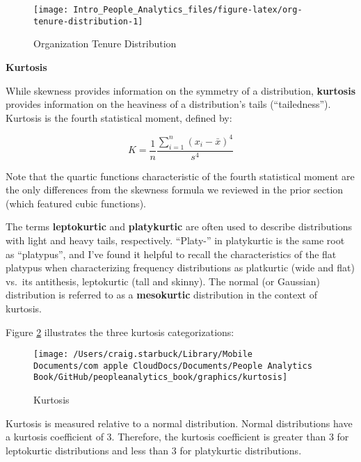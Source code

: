 \documentclass[
]{book}
\begin{document}
\begin{figure}

{\centering \texttt{[image: Intro\_People\_Analytics\_files/figure-latex/org-tenure-distribution-1]} 

}

\caption{Organization Tenure Distribution}\label{fig:org-tenure-distribution}
\end{figure}

\textbf{Kurtosis}

While skewness provides information on the symmetry of a distribution, \textbf{kurtosis} provides information on the heaviness of a distribution's tails (``tailedness''). Kurtosis is the fourth statistical moment, defined by:

\[ K = \frac{1}{n} \frac{\displaystyle\sum_{i=1}^{n} (x_i-\bar{x})^4}{s^4} \]

Note that the quartic functions characteristic of the fourth statistical moment are the only differences from the skewness formula we reviewed in the prior section (which featured cubic functions).

The terms \textbf{leptokurtic} and \textbf{platykurtic} are often used to describe distributions with light and heavy tails, respectively. ``Platy-'' in platykurtic is the same root as ``platypus'', and I've found it helpful to recall the characteristics of the flat platypus when characterizing frequency distributions as platkurtic (wide and flat) vs.~its antithesis, leptokurtic (tall and skinny). The normal (or Gaussian) distribution is referred to as a \textbf{mesokurtic} distribution in the context of kurtosis.

Figure \ref{fig:kurtosis} illustrates the three kurtosis categorizations:

\begin{figure}

{\centering \texttt{[image: /Users/craig.starbuck/Library/Mobile Documents/com~apple~CloudDocs/Documents/People Analytics Book/GitHub/peopleanalytics\_book/graphics/kurtosis]} 

}

\caption{Kurtosis}\label{fig:kurtosis}
\end{figure}

Kurtosis is measured relative to a normal distribution. Normal distributions have a kurtosis coefficient of 3. Therefore, the kurtosis coefficient is greater than 3 for leptokurtic distributions and less than 3 for platykurtic distributions.
\end{document}
